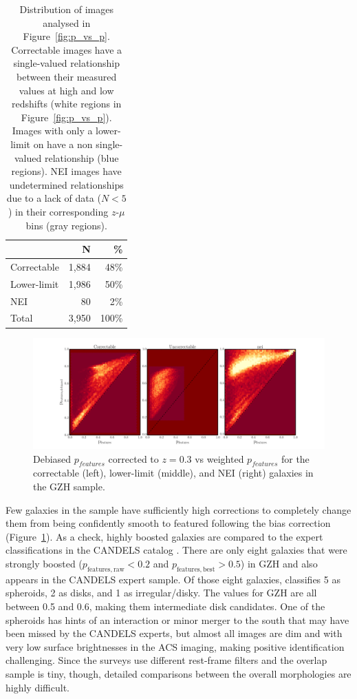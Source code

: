 \documentclass[twocolumn]{aastex6}
\begin{document}
\begin{table}
\center
\caption{Distribution of \ferengi{} images analysed in Figure~\ref{fig:p_vs_p}. Correctable images have a single-valued relationship between their measured \pfeatures{} values at high and low redshifts (white regions in Figure~\ref{fig:p_vs_p}). Images with only a lower-limit on \pfeatures{} have a non single-valued relationship (blue regions). NEI images have undetermined relationships due to a lack of data ($N<5$) in their corresponding $z$-$\mu$ bins (gray regions).\label{tbl:ferengi_corrections}}
\begin{tabular}{lrr}
\hline \hline
				                   & N       & \% \\
\hline 
Correctable                        & 1,884   & 48\% \\
Lower-limit                        & 1,986   & 50\% \\
NEI                                & 80      &  2\%\\
Total                              & 3,950   & 100\% \\
\hline \hline
\end{tabular}
\end{table}

\begin{figure}
\center
\includegraphics[width=\textwidth]{figures/debiased_corrections.pdf}
\caption{Debiased $p_{features}$ corrected to $z=0.3$ vs weighted $p_{features}$ for the correctable (left), lower-limit (middle), and NEI (right) galaxies in the GZH sample.}
\label{fig:debiased_corrections}
\end{figure}

Few galaxies in the sample have sufficiently high corrections to completely change them from being confidently smooth to featured following the bias correction (Figure~\ref{fig:debiased_corrections}). As a check, highly boosted galaxies are compared to the expert classifications in the CANDELS catalog \citep{kar15}. There are only eight galaxies that were strongly boosted ($p_\mathrm{features,raw}<0.2$ and $p_\mathrm{features,best} > 0.5$) in GZH and also appears in the CANDELS expert sample. Of those eight galaxies, \citet{kar15} classifies 5 as spheroids, 2 as disks, and 1 as irregular/disky. The \pbest{} values for GZH are all between 0.5 and 0.6, making them intermediate disk candidates. One of the spheroids has hints of an interaction or minor merger to the south that may have been missed by the CANDELS experts, but almost all images are dim and with very low surface brightnesses in the ACS imaging, making positive identification challenging. Since the surveys use different rest-frame filters and the overlap sample is tiny, though, detailed comparisons between the overall morphologies are highly difficult.
\end{document}
